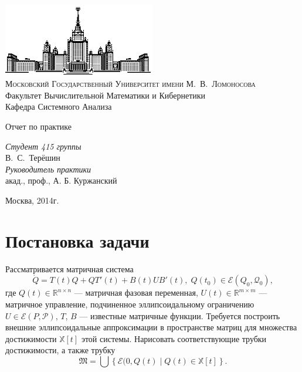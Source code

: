 \documentclass[12pt]{article}
\theoremstyle{rusdef}
\newcommand{\R}{\ensuremath{\mathbb{R}}} %
\newcommand{\E}{\ensuremath{\mathcal{E}}} %
\begin{document}
\thispagestyle{empty}

\begin{center}
\ \vspace{-3cm}

\includegraphics[width=0.5\textwidth]{msu.eps}\\

{\scshape Московский Государственный Университет имени М.~В.~Ломоносова}\\
Факультет Вычислительной Математики и Кибернетики\\
Кафедра Системного Анализа
\vfill

{\LARGE Отчет по практике}
\vspace{.5cm}

\end{center}

\vspace{1cm}

\begin{flushright}
\large
\textit{Студент 415 группы}\\
В.~С.~Терёшин\\
\vspace{5mm}
\textit{Руководитель практики}\\
акад., проф., А. Б. Куржанский

\end{flushright}

\vfill

\begin{center}
{\large
Москва, 2014г.}
\end{center}

\newpage
\tableofcontents
\newpage

\section{Постановка задачи}
Рассматривается матричная система
$$
\dot{Q} = T(t)Q + QT'(t) + B(t)UB'(t), \; Q(t_0) \in \E(Q_0,\mathcal{Q}_0),
$$
где $Q(t) \in \R^{n \times n}$ --- матричная фазовая переменная, $U(t) \in \R^{m \times m}$ --- матричное управление, подчиненное эллипсоидальному ограничению $U \in \E(P,\mathcal{P})$, $T$, $B$ --- известные матричные функции. Требуется построить внешние эллипсоидальные аппроксимации в пространстве матриц для множества достижимости $\mathbb{X}[t]$ этой системы. Нарисовать соответствующие трубки достижимости, а также трубку
$$
\mathfrak{M} = \bigcup \left\{ \E(0,Q(t) \mid Q(t) \in \mathbb{X}[t] \right\}.
$$
\end{document}
